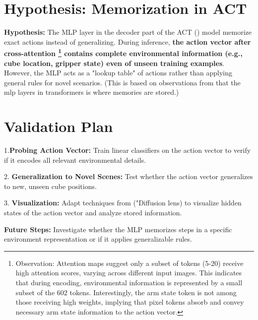 \documentclass[a4paper,12pt]{article}
\begin{document}
\section*{Hypothesis: Memorization in ACT}
\textbf{Hypothesis:} The MLP layer in the decoder part of the ACT (\cite{Zhao2023Apr}) model memorize exact actions instead of generalizing. 
During inference, \textbf{the action vector after cross-attention \footnote{
Observation: Attention maps suggest only a subset of tokens (5-20) receive high attention scores, varying across different input images. This indicates that during encoding, environmental information is represented by a small subset of the $602$ tokens. Interestingly, the arm state token is not among those receiving high weights, implying that pixel tokens absorb and convey necessary arm state information to the action vector.
} contains complete environmental information (e.g., cube location, gripper state) even of unseen training examples}. 
However, the MLP acts as a "lookup table" of actions rather than applying general rules for novel scenarios.
(This is based on observationa from \cite{Geva2020Dec,Meng2022Feb} that the mlp layers in transformers is where memories are stored.)

\section*{Validation Plan}
1.\textbf{Probing Action Vector:} Train linear classifiers on the action vector to verify if it encodes all relevant environmental details.

2. \textbf{Generalization to Novel Scenes:} Test whether the action vector generalizes to new, unseen cube positions.

3. \textbf{Visualization:} Adapt techniques from \cite{Toker2024Mar} ("Diffusion lens) to visualize hidden states of the action vector and analyze stored information.

\textbf{Future Steps:} Investigate whether the MLP memorizes steps in a specific environment representation or if it applies generalizable rules.


\end{document}
